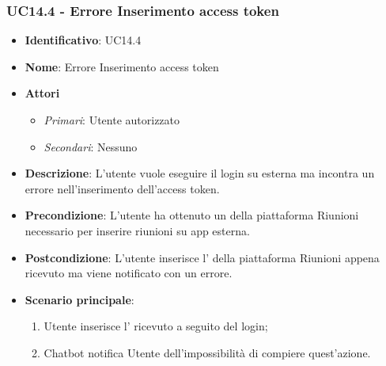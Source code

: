\subsubsection{UC14.4 - Errore Inserimento access token }
\begin{itemize}
	\item \textbf{Identificativo}: UC14.4
	\item \textbf{Nome}: Errore Inserimento access token
	\item \textbf{Attori}
	\begin{itemize} 
		\item \textit{Primari}: Utente autorizzato
		\item \textit{Secondari}: Nessuno
	\end{itemize}
	\item \textbf{Descrizione}: L'utente vuole eseguire il login su  esterna ma incontra un errore nell'inserimento dell'access token.
	\item \textbf{Precondizione}: L'utente ha ottenuto un  della piattaforma Riunioni necessario per inserire riunioni su app esterna.
	\item \textbf{Postcondizione}: L'utente inserisce l' della piattaforma Riunioni appena ricevuto ma viene notificato con un errore.
	\item \textbf{Scenario principale}: \begin{enumerate}
		\item Utente inserisce l' ricevuto a seguito del login; 
		\item Chatbot notifica Utente dell'impossibilità di compiere quest'azione.
	\end{enumerate}
\end{itemize}